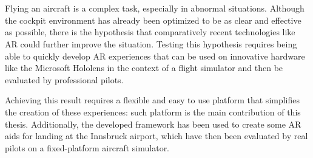\chapter{\abstractname}

Flying an aircraft is a complex task, especially in abnormal situations. Although the cockpit environment has already been optimized to be as clear and effective as possible, there is the hypothesis that comparatively recent technologies like \gls{AR} could further improve the situation. Testing this hypothesis requires being able to quickly develop \gls{AR} experiences that can be used on innovative hardware like the Microsoft Hololens in the context of a flight simulator and then be evaluated by professional pilots.

Achieving this result requires a flexible and easy to use platform that simplifies the creation of these experiences: such platform is the main contribution of this thesis. Additionally, the developed framework has been used to create some \gls{AR} aids for landing at the Innsbruck airport, which have then been evaluated by real pilots on a fixed-platform aircraft simulator.

\makeatletter
{}
{\renewcommand{\abstractname}{Kurzfassung}}
{\renewcommand{\abstractname}{Abstract}}
\makeatother